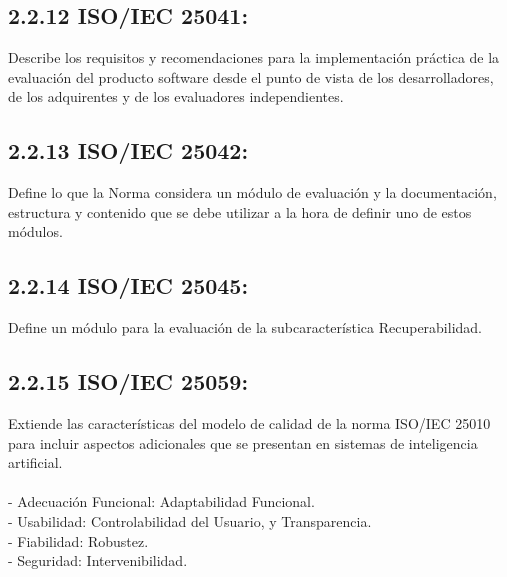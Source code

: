 \documentclass[https://www.overleaf.com/project/63761df255a8a9f4a15c3579
	letterpaper, %
	10pt, %
]{CSUniSchoolLabReport}
\begin{document}
        \subsection*{2.2.12 \hspace{0.5em} ISO/IEC 25041:} 
            Describe los requisitos y recomendaciones para la implementación práctica de la evaluación del producto software desde el punto de vista de los desarrolladores, de los adquirentes y de los evaluadores independientes.
            
        \subsection*{2.2.13 \hspace{0.5em} ISO/IEC 25042:}
            Define lo que la Norma considera un módulo de evaluación y la documentación, estructura y contenido que se debe utilizar a la hora de definir uno de estos módulos.
            
        \subsection*{2.2.14 \hspace{0.5em} ISO/IEC 25045:}
            Define un módulo para la evaluación de la subcaracterística Recuperabilidad.
            
        \subsection*{2.2.15 \hspace{0.5em} ISO/IEC 25059:}
            Extiende las características del modelo de calidad de la norma ISO/IEC 25010 para incluir aspectos adicionales que se presentan en sistemas de inteligencia artificial.
            \\\\
            - Adecuación Funcional: Adaptabilidad Funcional.
            \\
            - Usabilidad: Controlabilidad del Usuario, y Transparencia.
            \\
            - Fiabilidad: Robustez.
            \\
            - Seguridad: Intervenibilidad.



    
\end{document}
